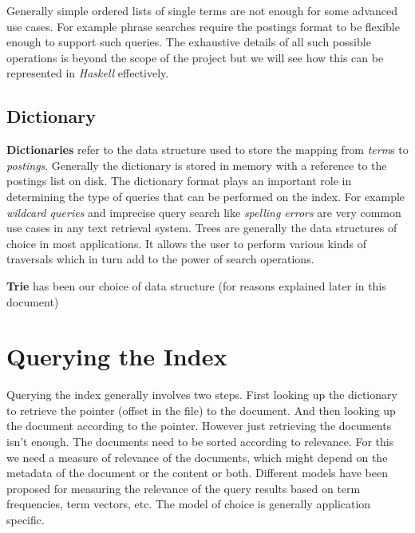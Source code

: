 Generally simple ordered lists of single terms are not enough for some advanced use cases.
For example phrase searches require the postings format to be flexible enough to support such queries.
The exhaustive details of all such possible operations is beyond the scope of the project but we will see how this can be represented
in \textit{Haskell} effectively.


\subsection{Dictionary}
\label{dictionary}
\textbf{Dictionaries} refer to the data structure used to store the mapping from \textit{term}s to \textit{postings}.
Generally the dictionary is stored in memory with a reference to the postings list on disk.
The dictionary format plays an important role in determining the type of queries that can be performed on the index.
For example \textit{wildcard queries} and imprecise query search like \textit{spelling errors} are very common use cases in any text retrieval system.
Trees are generally the data structures of choice in most applications.
It allows the user to perform various kinds of traversals which in turn add to the power of search operations.

\textbf{Trie} has been our choice of data structure (for reasons explained later in this document)


\section{Querying the Index}
Querying the index generally involves two steps.
First looking up the dictionary to retrieve the pointer (offset in the file) to the document.
And then looking up the document according to the pointer.
However just retrieving the documents isn't enough. The documents need to be sorted according to relevance.
For this we need a measure of relevance of the documents, which might depend on the metadata of the document or the content or both.
Different models have been proposed for measuring the relevance of the query results based on term frequencies, term vectors, etc.
The model of choice is generally application specific.

